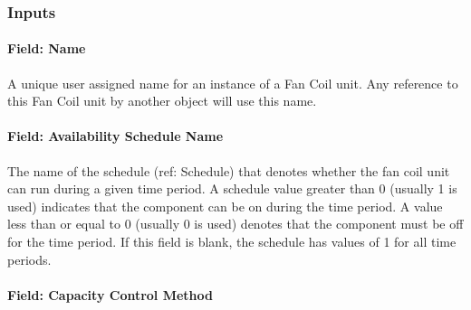 \subsubsection{Inputs}\label{inputs-1-053}

\paragraph{Field: Name}\label{field-name-1-051}

A unique user assigned name for an instance of a Fan Coil unit. Any reference to this Fan Coil unit by another object will use this name.

\paragraph{Field: Availability Schedule Name}\label{field-availability-schedule-name-1-015}

The name of the schedule (ref: Schedule) that denotes whether the fan coil unit can run during a given time period. A schedule value greater than 0 (usually 1 is used) indicates that the component can be on during the time period. A value less than or equal to 0 (usually 0 is used) denotes that the component must be off for the time period. If this field is blank, the schedule has values of 1 for all time periods.

\paragraph{Field: Capacity Control Method}\label{field-capacity-control-method}

